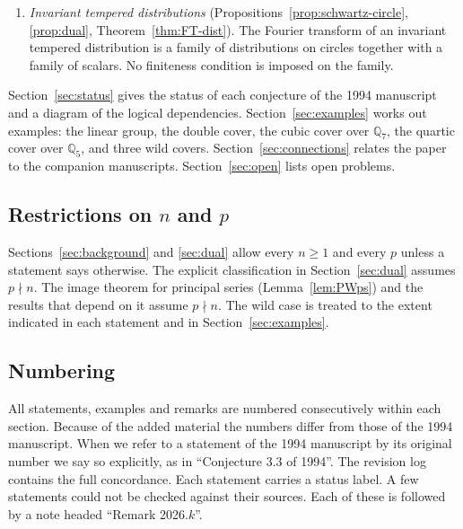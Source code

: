 \documentclass[12pt,letterpaper]{article}
\numberwithin{equation}{section}
\theoremstyle{definition}
\newcommand{\Q}{\mathbb Q}
\begin{document}
\begin{enumerate}[label=(\arabic*),leftmargin=*,itemsep=2pt]
Paley--Wiener theorems are restated on the irreducible duals, with the compatibility
relations of Example~\ref{ex:intro-linear}.  Necessity is proved.  Sufficiency is reduced
to the theorem of Bernstein, Deligne and Kazhdan for covers and to Li's tempered
Paley--Wiener theorem.
\item \emph{Invariant tempered distributions} (Propositions~\ref{prop:schwartz-circle},
\ref{prop:dual}, Theorem~\ref{thm:FT-dist}).  The Fourier transform of an invariant
tempered distribution is a family of distributions on circles together with a family of
scalars.  No finiteness condition is imposed on the family.
\end{enumerate}

Section~\ref{sec:status} gives the status of each conjecture of the 1994 manuscript and a
diagram of the logical dependencies.  Section~\ref{sec:examples} works out examples: the
linear group, the double cover, the cubic cover over $\Q_7$, the quartic cover over
$\Q_5$, and three wild covers.  Section~\ref{sec:connections} relates the paper to the
companion manuscripts.  Section~\ref{sec:open} lists open problems.

\subsection*{Restrictions on $n$ and $p$}
Sections~\ref{sec:background} and \ref{sec:dual} allow every $n\ge1$ and every $p$ unless
a statement says otherwise.  The explicit classification in Section~\ref{sec:dual} assumes
$p\nmid n$.  The image theorem for principal series (Lemma~\ref{lem:PWps}) and the results
that depend on it assume $p\nmid n$.  The wild case is treated to the extent indicated in
each statement and in Section~\ref{sec:examples}.

\subsection*{Numbering}
All statements, examples and remarks are numbered consecutively within each section.
Because of the added material the numbers differ from those of the 1994 manuscript.
When we refer to a statement of the 1994 manuscript by its original number we say so
explicitly, as in ``Conjecture 3.3 of 1994''.  The revision log contains the full
concordance.  Each statement carries a status label.  A few statements could not be
checked against their sources.  Each of these is followed by a note headed
``Remark 2026.$k$''.
\end{document}

